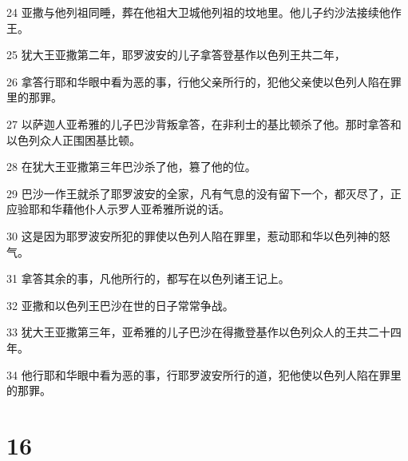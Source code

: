 \par 24 亚撒与他列祖同睡，葬在他祖大卫城他列祖的坟地里。他儿子约沙法接续他作王。
\par 25 犹大王亚撒第二年，耶罗波安的儿子拿答登基作以色列王共二年，
\par 26 拿答行耶和华眼中看为恶的事，行他父亲所行的，犯他父亲使以色列人陷在罪里的那罪。
\par 27 以萨迦人亚希雅的儿子巴沙背叛拿答，在非利士的基比顿杀了他。那时拿答和以色列众人正围困基比顿。
\par 28 在犹大王亚撒第三年巴沙杀了他，篡了他的位。
\par 29 巴沙一作王就杀了耶罗波安的全家，凡有气息的没有留下一个，都灭尽了，正应验耶和华藉他仆人示罗人亚希雅所说的话。
\par 30 这是因为耶罗波安所犯的罪使以色列人陷在罪里，惹动耶和华以色列神的怒气。
\par 31 拿答其余的事，凡他所行的，都写在以色列诸王记上。
\par 32 亚撒和以色列王巴沙在世的日子常常争战。
\par 33 犹大王亚撒第三年，亚希雅的儿子巴沙在得撒登基作以色列众人的王共二十四年。
\par 34 他行耶和华眼中看为恶的事，行耶罗波安所行的道，犯他使以色列人陷在罪里的那罪。

\chapter{16}

